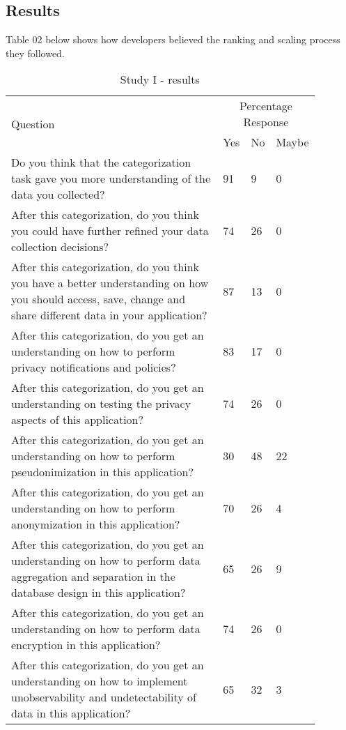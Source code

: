 \documentclass{sigchi}
\begin{document}
\subsection {Results}

Table 02 below shows how developers believed the ranking and scaling process they followed. 


\begin{center}
\begin{table*}[htbp]
\caption{Study I - results}
\begin{center}

\begin{tabular}{|p{0.7\linewidth}|p{0.06\linewidth}|p{0.06\linewidth}|p{0.06\linewidth}|} 
\hline
\multirow{2}{*}{Question}& \multicolumn{3}{|c|}{Percentage Response}\\   \cline{2-4}
&Yes&No&Maybe\\
\hline
Do you think that the categorization task gave you more understanding of the data you collected? & 91 & 9 & 0\\
\hline
After this categorization, do you think you could have further refined your data collection decisions? & 74 & 26 & 0 \\
\hline
After this categorization, do you think you have a better understanding on how you should access, save, change and share different data in your application? & 87 & 13 & 0 \\
\hline
After this categorization, do you get an understanding on how to perform privacy notifications and policies? & 83 & 17 & 0\\
\hline
After this categorization, do you get an understanding on testing the privacy aspects of this application? & 74 & 26 & 0\\
\hline
After this categorization, do you get an understanding on how to perform pseudonimization in this application? & 30 & 48 & 22\\
\hline
After this categorization, do you get an understanding on how to perform anonymization in this application? & 70 & 26 & 4\\
\hline
After this categorization, do you get an understanding on how to perform data aggregation and  separation in the database design in this application? & 65 & 26 & 9 \\
\hline
After this categorization, do you get an understanding on how to perform data encryption in this application? & 74 & 26 & 0 \\
\hline
After this categorization, do you get an understanding on how to implement unobservability and undetectability of data in this application? & 65 & 32 & 3 \\
\hline
\end{tabular}

\end{center}
\end{table*}
\end{center}
\end{document}
